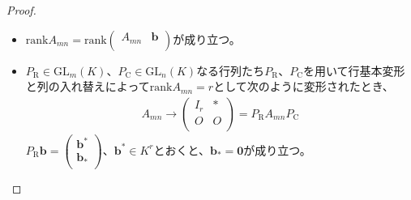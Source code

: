 \documentclass[dvipdfmx]{jsarticle}
\begin{document}
\begin{proof}
\begin{itemize}
\item
  ${\mathrm{rank}}A_{mn} = {\mathrm{rank}}\begin{pmatrix}
  A_{mn} & \mathbf{b} \\
  \end{pmatrix}$が成り立つ。
\item
  $P_{\mathrm{R}} \in {\mathrm{GL}}_{m}(K)$、$P_{\mathrm{C}} \in {\mathrm{GL}}_{n}(K)$なる行列たち$P_{\mathrm{R}}$、$P_{\mathrm{C}}$を用いて行基本変形と列の入れ替えによって${\mathrm{rank}}A_{mn} = r$として次のように変形されたとき、
\begin{align*}
A_{mn} \rightarrow \begin{pmatrix}
I_{r} & * \\
O & O \\
\end{pmatrix} = P_{\mathrm{R}}A_{mn}P_{\mathrm{C}}
\end{align*}
$P_{\mathrm{R}}\mathbf{b} = \begin{pmatrix}
\mathbf{b}^{*} \\
\mathbf{b}_{*} \\
\end{pmatrix}$、$\mathbf{b}^{*} \in K^{r}$とおくと、$\mathbf{b}_{*} = \mathbf{0}$が成り立つ。
\end{itemize}
\end{proof}
\end{document}
